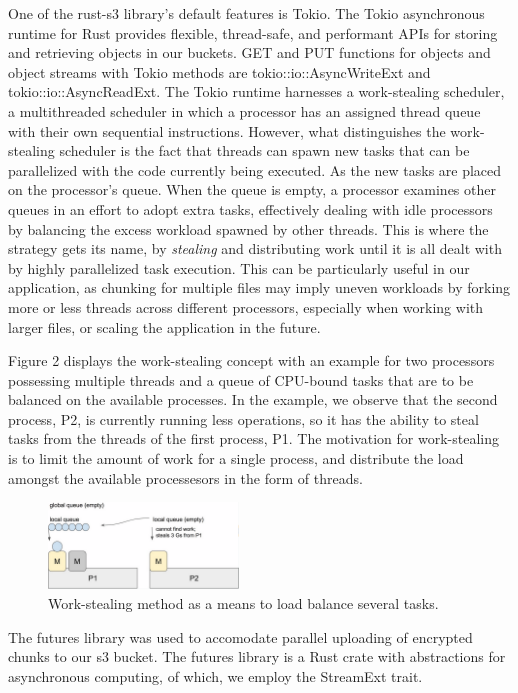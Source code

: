 \documentclass[conference]{IEEEtran}
\begin{document}
One of the rust-s3 library's default features is Tokio. The Tokio asynchronous runtime for Rust provides flexible, 
thread-safe, and performant APIs for storing and retrieving objects in our buckets. GET and PUT functions for objects
and object streams with Tokio methods are tokio::io::AsyncWriteExt and tokio::io::AsyncReadExt. The Tokio runtime harnesses
a work-stealing scheduler, a multithreaded scheduler in which a processor has an assigned thread queue with their own 
sequential instructions. However, what distinguishes the work-stealing scheduler is the fact that threads can spawn new tasks 
that can be parallelized with the code currently being executed. As the new tasks are placed on the processor's queue. When the 
queue is empty, a processor examines other queues in an effort to adopt extra tasks, effectively dealing with idle processors 
by balancing the excess workload spawned by other threads. This is where the strategy gets its name, by \textit{stealing} and
distributing work until it is all dealt with by highly parallelized task execution. This can be particularly useful in our 
application, as chunking for multiple files may imply uneven workloads by forking more or less threads across different processors, 
especially when working with larger files, or scaling the application in the future.

Figure 2 displays the work-stealing concept with an example for two processors possessing multiple threads and a queue of CPU-bound 
tasks that are to be balanced on the available processes. In the example, we observe that the second process, P2, is currently running less
operations, so it has the ability to steal tasks from the threads of the first process, P1. The motivation for work-stealing is to
limit the amount of work for a single process, and distribute the load amongst the available processesors in the form of threads. 

\begin{figure}[h]
	\caption{Work-stealing method as a means to load balance several tasks.}
	\centering
	\includegraphics[width=0.45\textwidth]{work-stealing.png}
\end{figure}

The futures library was used to accomodate parallel uploading of encrypted chunks to our s3 bucket. The futures library is a
Rust crate with abstractions for asynchronous computing, of which, we employ the StreamExt trait.
\end{document}
